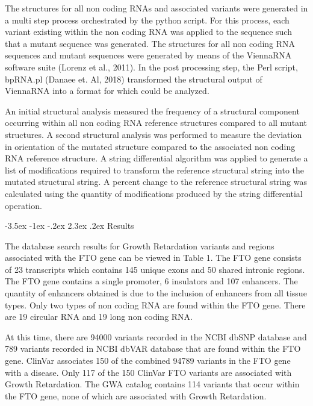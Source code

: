 \documentclass[11pt]{article}
\makeatletter
\renewcommand\section{\@startsection {section}{1}{\z@}%
                                       {-3.5ex \@plus -1ex \@minus -.2ex}%
                                       {2.3ex \@plus.2ex}%
                                       {\normalfont\fontfamily{phv}\fontsize{16}{19}\bfseries}}
\makeatother
\begin{document}
The structures for all non coding RNAs and associated variants were generated in a multi step process orchestrated by the python script. For this process, each variant existing within the non coding RNA was applied to the sequence such that a mutant sequence was generated. The structures for all non coding RNA sequences and mutant sequences were generated by means of the ViennaRNA software suite (Lorenz et al., 2011). In the post processing step, the Perl script, bpRNA.pl (Danaee et. Al, 2018) transformed the structural output of ViennaRNA into a format for which could be analyzed.  

An initial structural analysis measured the frequency of a structural component occurring within all non coding RNA reference structures compared to all mutant structures. A second structural analysis was performed to measure the deviation in orientation of the mutated structure compared to the associated non coding RNA reference structure. A string differential algorithm was applied to generate a list of modifications required to transform the reference structural string into the mutated structural string. A percent change to the reference structural string was calculated using the quantity of modifications produced by the string differential operation.  

\section{Results} \label{s:results}

The database search results for Growth Retardation variants and regions associated with the FTO gene can be viewed in Table 1. The FTO gene consists of 23 transcripts which contains 145 unique exons and 50 shared intronic regions. The FTO gene contains a single promoter, 6 insulators and 107 enhancers. The quantity of enhancers obtained is due to the inclusion of enhancers from all tissue types. Only two types of non coding RNA are found within the FTO gene. There are 19 circular RNA and 19 long non coding RNA. 

At this time, there are 94000 variants recorded in the NCBI dbSNP database and 789 variants recorded in NCBI dbVAR database that are found within the FTO gene. ClinVar associates 150 of the combined 94789 variants in the FTO gene with a disease. Only 117 of the 150 ClinVar FTO variants are associated with Growth Retardation. The GWA catalog contains 114 variants that occur within the FTO gene, none of which are associated with Growth Retardation. 
\end{document}
